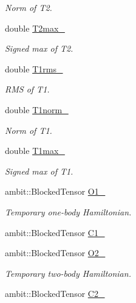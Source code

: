 \begin{DoxyCompactItemize}
\begin{DoxyCompactList}\small\item\em Norm of T2. \end{DoxyCompactList}\item 
double \mbox{\hyperlink{classforte_1_1_s_a___m_r_d_s_r_g_a539633d52b2b612aa36aea752f6dedce}{T2max\+\_\+}}
\begin{DoxyCompactList}\small\item\em Signed max of T2. \end{DoxyCompactList}\item 
double \mbox{\hyperlink{classforte_1_1_s_a___m_r_d_s_r_g_af09eef805c10d8e14c0fb3d5002eeb53}{T1rms\+\_\+}}
\begin{DoxyCompactList}\small\item\em R\+MS of T1. \end{DoxyCompactList}\item 
double \mbox{\hyperlink{classforte_1_1_s_a___m_r_d_s_r_g_a50375d746a61cf18830a4275ee46cb57}{T1norm\+\_\+}}
\begin{DoxyCompactList}\small\item\em Norm of T1. \end{DoxyCompactList}\item 
double \mbox{\hyperlink{classforte_1_1_s_a___m_r_d_s_r_g_a9f54e17ec575b38caf0cbe12e053c8ce}{T1max\+\_\+}}
\begin{DoxyCompactList}\small\item\em Signed max of T1. \end{DoxyCompactList}\item 
ambit\+::\+Blocked\+Tensor \mbox{\hyperlink{classforte_1_1_s_a___m_r_d_s_r_g_a9fb946367aaf73eb974ae1ebeabd301c}{O1\+\_\+}}
\begin{DoxyCompactList}\small\item\em Temporary one-\/body Hamiltonian. \end{DoxyCompactList}\item 
ambit\+::\+Blocked\+Tensor \mbox{\hyperlink{classforte_1_1_s_a___m_r_d_s_r_g_a6b904bc68b50032276b71fa4590b8eca}{C1\+\_\+}}
\item 
ambit\+::\+Blocked\+Tensor \mbox{\hyperlink{classforte_1_1_s_a___m_r_d_s_r_g_a4f0dad45d56d3876ac781aa9318c989c}{O2\+\_\+}}
\begin{DoxyCompactList}\small\item\em Temporary two-\/body Hamiltonian. \end{DoxyCompactList}\item 
ambit\+::\+Blocked\+Tensor \mbox{\hyperlink{classforte_1_1_s_a___m_r_d_s_r_g_ab1b90e873d1ad08ae0f9a5e5875dbd9c}{C2\+\_\+}}

\end{DoxyCompactItemize}
